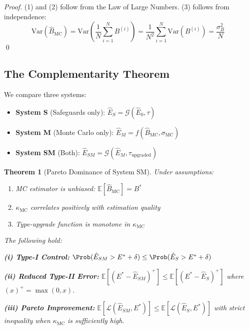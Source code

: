\documentclass[11pt,a4paper]{article}
\newtheorem{theorem}{Theorem}[section]
\begin{document}
\begin{proof}
(1) and (2) follow from the Law of Large Numbers. (3) follows from independence:
\[
\mathrm{Var}(\hat{B}_{\mathrm{MC}}) = \mathrm{Var}\left(\frac{1}{N}\sum_{i=1}^N B^{(i)}\right) = \frac{1}{N^2} \sum_{i=1}^N \mathrm{Var}(B^{(i)}) = \frac{\sigma_B^2}{N}
\]
\qed
\end{proof}

\subsection{The Complementarity Theorem}

We compare three systems:
\begin{itemize}
    \item \textbf{System S} (Safeguards only): $\hat{E}_S = \mathcal{G}(\hat{E}_0, \tau)$
    \item \textbf{System M} (Monte Carlo only): $\hat{E}_M = f(\hat{B}_{\mathrm{MC}}, \sigma_{\mathrm{MC}})$
    \item \textbf{System SM} (Both): $\hat{E}_{SM} = \mathcal{G}(\hat{E}_M, \tau_{\mathrm{upgraded}})$
\end{itemize}

\begin{theorem}[Pareto Dominance of System SM]
\label{thm:pareto-app}
Under assumptions:
\begin{enumerate}
    \item[(A1)] MC estimator is unbiased: $\mathbb{E}[\hat{B}_{\mathrm{MC}}] = B^*$
    \item[(A2)] $\kappa_{\mathrm{MC}}$ correlates positively with estimation quality
    \item[(A3)] Type-upgrade function is monotone in $\kappa_{\mathrm{MC}}$
\end{enumerate}

The following hold:

\textbf{(i) Type-I Control:}
$\Prob(\hat{E}_{SM} > E^* + \delta) \leq \Prob(\hat{E}_S > E^* + \delta)$

\textbf{(ii) Reduced Type-II Error:}
$\mathbb{E}[(E^* - \hat{E}_{SM})^+] \leq \mathbb{E}[(E^* - \hat{E}_S)^+]$
where $(x)^+ = \max(0, x)$.

\textbf{(iii) Pareto Improvement:}
$\mathbb{E}[\mathcal{L}(\hat{E}_{SM}, E^*)] \leq \mathbb{E}[\mathcal{L}(\hat{E}_S, E^*)]$
with strict inequality when $\kappa_{\mathrm{MC}}$ is sufficiently high.
\end{theorem}
\end{document}

